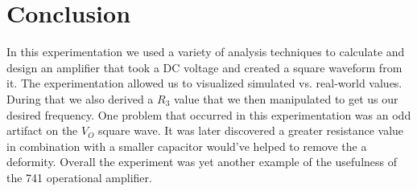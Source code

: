 \documentclass[12pt]{article}
\begin{document}
\section{Conclusion}

In this experimentation we used a variety of analysis techniques to calculate and design an amplifier that took a DC voltage and created a square waveform from it. The experimentation allowed us to visualized simulated vs. real-world values. During that we also derived a $R_3$ value that we then manipulated to get us our desired frequency. One problem that occurred in this experimentation was an odd artifact on the $V_O$ square wave. It was later discovered a greater resistance value in combination with a smaller capacitor would've helped to remove the a deformity. Overall the experiment was yet another example of the usefulness of the 741 operational amplifier.
\end{document}
